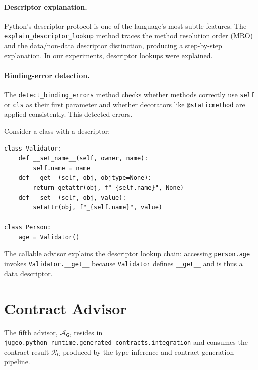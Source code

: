 \documentclass[11pt]{article}
\newcommand{\Adv}{\mathcal{A}}
\newcommand{\AdvG}{\Adv_{\mathsf{G}}}
\newcommand{\ContractRes}{\mathcal{R}_{\mathsf{G}}}
\begin{document}
\paragraph{Descriptor explanation.}
Python's descriptor protocol is one of the language's most subtle
features.  The \texttt{explain\_descriptor\_lookup} method traces the
method resolution order (MRO) and the data/non-data descriptor
distinction, producing a step-by-step explanation.  In our experiments,
\ppXCcallableDescriptorExplained{} descriptor lookups were explained.

\paragraph{Binding-error detection.}
The \texttt{detect\_binding\_errors} method checks whether methods
correctly use \texttt{self} or \texttt{cls} as their first parameter
and whether decorators like \texttt{@staticmethod} are applied
consistently.  This detected \ppXCcallableBindingErrors{} errors.

\begin{example}\label{ex:callable}
Consider a class with a descriptor:
\begin{lstlisting}[style=jugeo-python]
class Validator:
    def __set_name__(self, owner, name):
        self.name = name
    def __get__(self, obj, objtype=None):
        return getattr(obj, f"_{self.name}", None)
    def __set__(self, obj, value):
        setattr(obj, f"_{self.name}", value)

class Person:
    age = Validator()
\end{lstlisting}
The callable advisor explains the descriptor lookup chain: accessing
\texttt{person.age} invokes \texttt{Validator.\_\_get\_\_} because
\texttt{Validator} defines \texttt{\_\_get\_\_} and is thus a
data descriptor.
\end{example}

\section{Contract Advisor}\label{sec:contract}

The fifth advisor, $\AdvG$, resides in
\texttt{jugeo.python\_runtime.generated\_contracts.integration} and
consumes the contract result $\ContractRes$ produced by the type
inference and contract generation pipeline.
\end{document}
